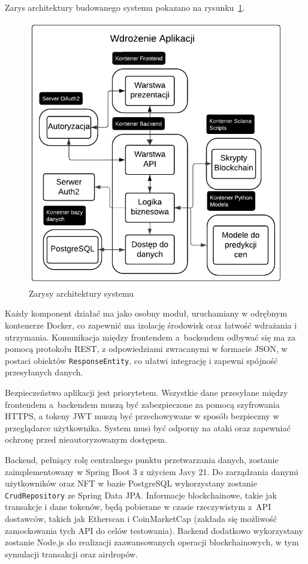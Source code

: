Zarys architektury budowanego systemu pokazano na rysunku~\ref{fig:ZarysyArchitekturySystemu}.
\begin{figure}[htb] %
    \centering
    \includegraphics[width=0.7\linewidth]{Diagram.pdf}
    \caption{Zarysy architektury systemu}
    \label{fig:ZarysyArchitekturySystemu}
\end{figure}

Każdy komponent działać ma jako osobny moduł, uruchamiany w odrębnym kontenerze Docker, co zapewnić ma izolację środowisk oraz łatwość wdrażania i utrzymania. Komunikacja między frontendem a~backendem odbywać się ma za pomocą protokołu REST, z odpowiedziami zwracanymi w formacie JSON, w postaci obiektów \texttt{ResponseEntity}, co ułatwi integrację i zapewni spójność przesyłanych danych.

Bezpieczeństwo aplikacji jest priorytetem. Wszystkie dane przesyłane między frontendem a~backendem muszą być zabezpieczone za pomocą szyfrowania HTTPS, a tokeny JWT muszą być przechowywane w sposób bezpieczny w przeglądarce użytkownika. System musi być odporny na ataki oraz zapewniać ochronę przed nieautoryzowanym dostępem.

Backend, pełniący rolę centralnego punktu przetwarzania danych, zostanie zaimplementowany w Spring Boot 3 z użyciem Javy 21. Do zarządzania danymi użytkowników oraz NFT w bazie PostgreSQL wykorzystany zostanie \texttt{CrudRepository} ze Spring Data JPA. Informacje blockchainowe, takie jak transakcje i dane tokenów, będą pobierane w czasie rzeczywistym z~API dostawców, takich jak Etherscan \cite{etherscan_api} i CoinMarketCap \cite{coinmarketcap_api} (zakłada się możliwość zamockowania tych API do celów testowania). Backend dodatkowo wykorzystany zostanie Node.js do realizacji zaawansowanych operacji blockchainowych, w tym symulacji transakcji oraz airdropów.

